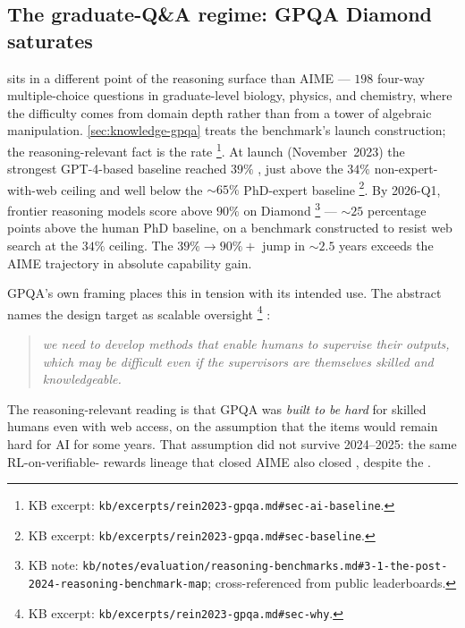 \subsection{The graduate-Q\&A regime: GPQA Diamond saturates}
\label{sec:reasoning-gpqa}

 \citep{rein2023-gpqa} sits in a different point of the
reasoning surface than AIME --- $198$ four-way multiple-choice
questions in graduate-level biology, physics, and chemistry, where
the difficulty comes from domain depth rather than from a tower of
algebraic manipulation. \cref{sec:knowledge-gpqa} treats the
benchmark's launch construction; the reasoning-relevant fact is
the  rate%
\footnote{KB excerpt: \nolinkurl{kb/excerpts/rein2023-gpqa.md#sec-ai-baseline}.}.
At launch (November~2023) the strongest GPT-4-based baseline
reached $39\%$ \citep[\S{}sec-ai-baseline]{rein2023-gpqa}, just above
the $34\%$ non-expert-with-web ceiling and well below the
$\sim 65\%$ PhD-expert baseline%
\footnote{KB excerpt: \nolinkurl{kb/excerpts/rein2023-gpqa.md#sec-baseline}.}.
By 2026-Q1, frontier reasoning models score above $90\%$ on Diamond%
\footnote{KB note: \nolinkurl{kb/notes/evaluation/reasoning-benchmarks.md#3-1-the-post-2024-reasoning-benchmark-map}; cross-referenced from public leaderboards.}
--- $\sim 25$ percentage points above the human PhD baseline, on a
benchmark constructed to resist web search at the $34\%$ ceiling. The
$39\% \to 90\%+$ jump in $\sim 2.5$ years exceeds the AIME
trajectory in absolute capability gain.

GPQA's own framing places this  in tension with its
intended use. The abstract names the design target as scalable
oversight%
\footnote{KB excerpt: \nolinkurl{kb/excerpts/rein2023-gpqa.md#sec-why}.}
\citep[\S{}sec-why]{rein2023-gpqa}:

\begin{quote}\itshape
we need to develop  methods that enable humans to
supervise their outputs, which may be difficult even if the
supervisors are themselves skilled and knowledgeable.
\end{quote}

The reasoning-relevant reading is that GPQA was \emph{built to be
hard} for skilled humans even with web access, on the assumption
that the items would remain hard for AI for some years. That
assumption did not survive 2024--2025: the same RL-on-verifiable-
rewards lineage that closed AIME also closed , despite
the .

